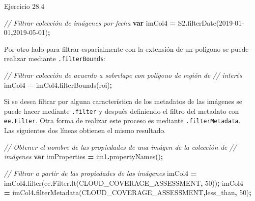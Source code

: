 \documentclass[
  12pt,
  letterpaper,
  twoside]{book}
\newenvironment{Shaded}{\begin{snugshade}}{\end{snugshade}}
\newcommand{\AttributeTok}[1]{\textcolor[rgb]{0.77,0.63,0.00}{#1}}
\newcommand{\CommentTok}[1]{\textcolor[rgb]{0.56,0.35,0.01}{\textit{#1}}}
\newcommand{\DecValTok}[1]{\textcolor[rgb]{0.00,0.00,0.81}{#1}}
\newcommand{\FunctionTok}[1]{\textcolor[rgb]{0.00,0.00,0.00}{#1}}
\newcommand{\KeywordTok}[1]{\textcolor[rgb]{0.13,0.29,0.53}{\textbf{#1}}}
\newcommand{\NormalTok}[1]{#1}
\newcommand{\OperatorTok}[1]{\textcolor[rgb]{0.81,0.36,0.00}{\textbf{#1}}}
\newcommand{\StringTok}[1]{\textcolor[rgb]{0.31,0.60,0.02}{#1}}
\begin{document}
Ejercicio 28.4

\begin{Shaded}
\begin{Highlighting}[]
\CommentTok{// Filtrar colección de imágenes por fecha}
\KeywordTok{var}\NormalTok{ imCol4 }\OperatorTok{=}\NormalTok{ S2}\OperatorTok{.}\FunctionTok{filterDate}\NormalTok{(}\StringTok{\textquotesingle{}2019{-}01{-}01\textquotesingle{}}\OperatorTok{,}\StringTok{\textquotesingle{}2019{-}05{-}01\textquotesingle{}}\NormalTok{)}\OperatorTok{;}
\end{Highlighting}
\end{Shaded}

Por otro lado para filtrar espacialmente con la extensión de un polígono se puede realizar mediante \texttt{.filterBounds}:

\begin{Shaded}
\begin{Highlighting}[]
\CommentTok{// Filtrar colección de acuerdo a sobrelape con polígono de región de }
\CommentTok{// interés}
\NormalTok{imCol4 }\OperatorTok{=}\NormalTok{ imCol4}\OperatorTok{.}\FunctionTok{filterBounds}\NormalTok{(roi)}\OperatorTok{;}
\end{Highlighting}
\end{Shaded}

Si se desea filtrar por alguna característica de los metadatos de las imágenes se puede hacer mediante \texttt{.filter} y después definiendo el filtro del metadato con \texttt{ee.Filter}. Otra forma de realizar este proceso es mediante \texttt{.filterMetadata}. Las siguientes dos líneas obtienen el mismo resultado.

\begin{Shaded}
\begin{Highlighting}[]
\CommentTok{// Obtener el nombre de las propiedades de una imágen de la colección de }
\CommentTok{// imágenes}
\KeywordTok{var}\NormalTok{ imProperties }\OperatorTok{=}\NormalTok{ im1}\OperatorTok{.}\FunctionTok{propertyNames}\NormalTok{()}\OperatorTok{;}

\CommentTok{// Filtrar a partir de las propiedades de las imágenes}
\NormalTok{imCol4 }\OperatorTok{=}\NormalTok{ imCol4}\OperatorTok{.}\FunctionTok{filter}\NormalTok{(ee}\OperatorTok{.}\AttributeTok{Filter}\OperatorTok{.}\FunctionTok{lt}\NormalTok{(}\StringTok{\textquotesingle{}CLOUD\_COVERAGE\_ASSESSMENT\textquotesingle{}}\OperatorTok{,} \DecValTok{50}\NormalTok{))}\OperatorTok{;}
\NormalTok{imCol4 }\OperatorTok{=}\NormalTok{ imCol4}\OperatorTok{.}\FunctionTok{filterMetadata}\NormalTok{(}\StringTok{\textquotesingle{}CLOUD\_COVERAGE\_ASSESSMENT\textquotesingle{}}\OperatorTok{,}\StringTok{\textquotesingle{}less\_than\textquotesingle{}}\OperatorTok{,} \DecValTok{50}\NormalTok{)}\OperatorTok{;}
\end{Highlighting}
\end{Shaded}
\end{document}
